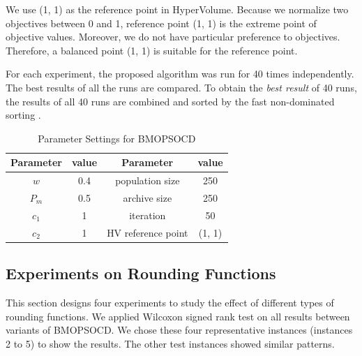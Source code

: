 \documentclass[10pt,journal,compsoc]{IEEEtran}
\begin{document}
We use (1, 1) as the reference point in HyperVolume. Because we normalize two objectives between 0 and 1, reference point (1, 1) is the extreme point of objective values. Moreover, we do not have particular preference to objectives. Therefore, a balanced point (1, 1) is suitable for the reference point.

For each experiment, the proposed algorithm was run for 40 times independently. The best results of all the runs are compared.  To obtain the \emph{best result} of 40 runs, the results of all 40 runs are combined and sorted by the fast non-dominated sorting \cite{nsgaii}.

\begin{table}[]
\centering
\caption{Parameter Settings for BMOPSOCD}
\label{parameter}
\begin{tabular}{@{}cccc@{}}
\toprule
Parameter & value & Parameter          & value  \\ \midrule
$w$         & 0.4 \cite{xin2009particle}   & population size    & 250    \\
$P_m$      & 0.5  \cite{Raquel} & archive size       & 250    \\
$c_1$      & 1 \cite{Raquel}    & iteration          & 50     \\
$c_2$      & 1 \cite{Raquel}    & HV reference point & (1, 1) \\ \bottomrule
\end{tabular}
\end{table}



\subsection{Experiments on Rounding Functions}\label{sec:expRound}
This section designs four experiments to study the effect of different types of rounding functions. We applied Wilcoxon signed rank test on all results between variants of BMOPSOCD. We chose these four representative instances (instances 2 to 5) to show the results. The other test instances showed similar patterns.

\end{document}
